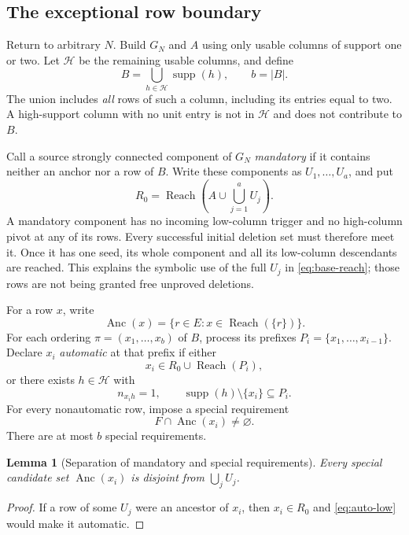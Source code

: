 \documentclass[11pt,letterpaper]{article}
\newtheorem{lemma}[theorem]{Lemma}
\theoremstyle{definition}
\theoremstyle{remark}
\DeclareMathOperator{\supp}{supp}
\DeclareMathOperator{\Reach}{Reach}
\DeclareMathOperator{\Anc}{Anc}
\begin{document}
\subsection{The exceptional row boundary}
Return to arbitrary $N$. Build $G_N$ and $A$ using only usable columns of support
one or two. Let $\mathcal H$ be the remaining usable columns, and define
\begin{equation}\label{eq:boundary}
 B=\bigcup_{h\in\mathcal H}\supp(h),\qquad b=|B|.
\end{equation}
The union includes \emph{all} rows of such a column, including its entries equal
to two. A high-support column with no unit entry is not in $\mathcal H$ and does
not contribute to $B$.

Call a source strongly connected component of $G_N$ \emph{mandatory} if it
contains neither an anchor nor a row of $B$. Write these components as
$U_1,\ldots,U_a$, and put
\begin{equation}\label{eq:base-reach}
 R_0=\Reach\!\left(A\cup\bigcup_{j=1}^a U_j\right).
\end{equation}
A mandatory component has no incoming low-column trigger and no high-column
pivot at any of its rows. Every successful initial deletion set must therefore
meet it. Once it has one seed, its whole component and all its low-column
descendants are reached. This explains the symbolic use of the full $U_j$ in
\eqref{eq:base-reach}; those rows are not being granted free unproved deletions.

For a row $x$, write
\[
 \Anc(x)=\{r\in E:x\in\Reach(\{r\})\}.
\]
For each ordering $\pi=(x_1,\ldots,x_b)$ of $B$, process its prefixes
$P_i=\{x_1,\ldots,x_{i-1}\}$. Declare $x_i$ \emph{automatic} at that prefix if
either
\begin{equation}\label{eq:auto-low}
 x_i\in R_0\cup\Reach(P_i),
\end{equation}
or there exists $h\in\mathcal H$ with
\begin{equation}\label{eq:auto-high}
 n_{x_i h}=1,\qquad \supp(h)\setminus\{x_i\}\subseteq P_i.
\end{equation}
For every nonautomatic row, impose a special requirement
\begin{equation}\label{eq:ancestor-demand}
 F\cap\Anc(x_i)\ne\varnothing.
\end{equation}
There are at most $b$ special requirements.

\begin{lemma}[Separation of mandatory and special requirements]\label{lem:disjoint}
Every special candidate set $\Anc(x_i)$ is disjoint from $\bigcup_jU_j$.
\end{lemma}
\begin{proof}
If a row of some $U_j$ were an ancestor of $x_i$, then $x_i\in R_0$ and
\eqref{eq:auto-low} would make it automatic.
\end{proof}
\end{document}
